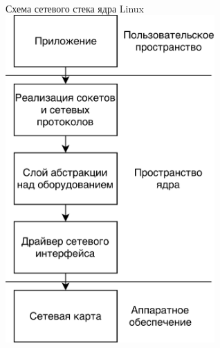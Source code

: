 \documentclass{beamer}
\begin{document}
\newpage
\hfill
\\
\vspace{2em}
Схема сетевого стека ядра Linux
\vfill
\includegraphics[width=0.6\textwidth]{images_posters/networking.png}
\vfill
\end{document}
